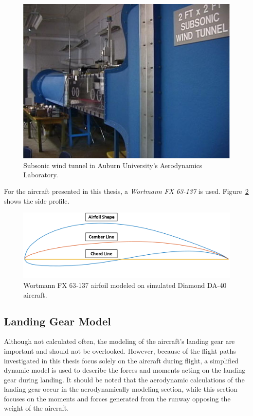 \documentclass[12pt]{report}
\begin{document}
\begin{figure}[!ht]\label{fig:windtunnel}
  \centering
  \includegraphics[width=.75\linewidth]{Figures/opencircuitwindtunnel.jpg}
  \caption{Subsonic wind tunnel in Auburn University's Aerodynamics Laboratory.}
\end{figure}









For the aircraft presented in this thesis, a \textit{Wortmann FX 63{-}137} is used. Figure~\ref{fig:airfoil} shows the side profile.

\begin{figure}[!ht]\label{fig:airfoil}
  \centering
  \includegraphics[width=\linewidth]{Figures/da40airfoil.png}
  \caption{Wortmann FX 63{-}137 airfoil modeled on simulated Diamond DA-40 aircraft.}
\end{figure}

\subsection{Landing Gear Model}
Although not calculated often, the modeling of the aircraft's landing gear are important and should not be overlooked. However, because of the flight paths investigated in this thesis focus solely on the aircraft during flight, a simplified dynamic model is used to describe the forces and moments acting on the landing gear during landing. It should be noted that the aerodynamic calculations of the landing gear occur in the aerodynamically modeling section, while this section focuses on the moments and forces generated from the runway opposing the weight of the aircraft.
\end{document}
